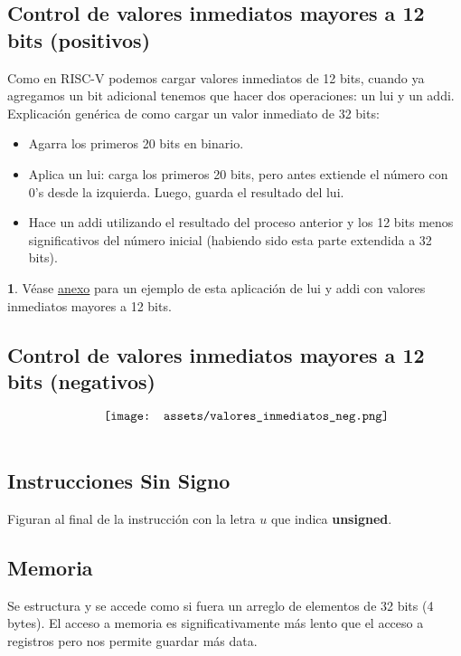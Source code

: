 \documentclass[10pt,a4paper]{article}
\begin{document}
\subsection*{Control de valores inmediatos mayores a 12 bits (positivos)}
Como en RISC-V podemos cargar valores inmediatos de 12 bits, cuando ya agregamos un bit adicional tenemos que hacer dos operaciones: un lui y un addi. \\
Explicación genérica de como cargar un valor inmediato de 32 bits:
\begin{itemize}
    \item Agarra los primeros 20 bits en binario.
    \item Aplica un lui: carga los primeros 20 bits, pero antes extiende el número con 0's desde la izquierda. Luego, guarda el resultado del lui.
    \item Hace un addi utilizando el resultado del proceso anterior y los 12 bits menos significativos del número inicial (habiendo sido esta parte extendida a 32 bits).
\end{itemize}
\textbf{1}.  
Véase \hyperref[subsec:valores_inmediatos_32_bits]{anexo} para un ejemplo de esta aplicación de lui y addi con valores inmediatos mayores a 12 bits.
\subsection*{Control de valores inmediatos mayores a 12 bits (negativos)}
\[\begin{minipage}[b]{0.6\textwidth}
    \texttt{[image: assets/valores\_inmediatos\_neg.png]}
    \label{fig:valores_neg}
\end{minipage}\]
\subsection*{Instrucciones Sin Signo}
Figuran al final de la instrucción con la letra $u$ que indica \textbf{unsigned}.
\subsection*{Memoria}
Se estructura y se accede como si fuera un arreglo de elementos de 32 bits (4 bytes). El acceso a memoria es significativamente más lento que el acceso a registros pero nos permite guardar más data. 
\end{document}
